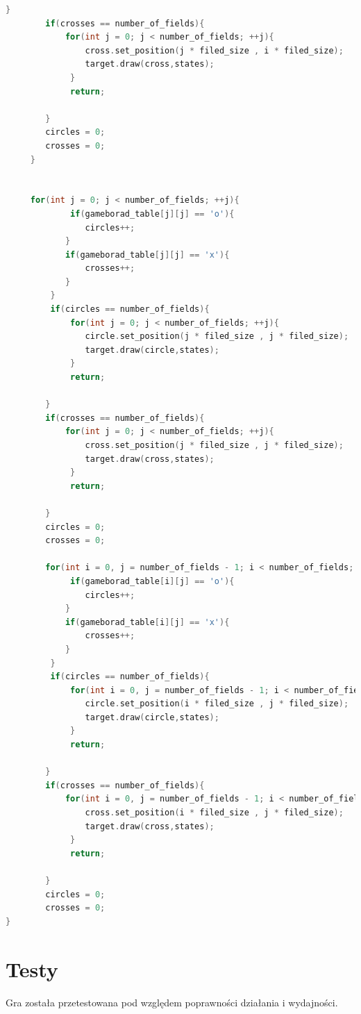 \documentclass[12pt]{article}
\begin{document}
\begin{lstlisting}[language=C++, caption=draw()]
        }
        if(crosses == number_of_fields){
            for(int j = 0; j < number_of_fields; ++j){
                cross.set_position(j * filed_size , i * filed_size);
                target.draw(cross,states);
             }
             return;

        }
        circles = 0;
        crosses = 0;
     }  


     for(int j = 0; j < number_of_fields; ++j){
             if(gameborad_table[j][j] == 'o'){
                circles++;
            }
            if(gameborad_table[j][j] == 'x'){
                crosses++;
            }
         }
         if(circles == number_of_fields){
             for(int j = 0; j < number_of_fields; ++j){
                circle.set_position(j * filed_size , j * filed_size);
                target.draw(circle,states);
             }
             return;

        }
        if(crosses == number_of_fields){
            for(int j = 0; j < number_of_fields; ++j){
                cross.set_position(j * filed_size , j * filed_size);
                target.draw(cross,states);
             }
             return;

        }
        circles = 0;
        crosses = 0;

        for(int i = 0, j = number_of_fields - 1; i < number_of_fields; ++i, --j){
             if(gameborad_table[i][j] == 'o'){
                circles++;
            }
            if(gameborad_table[i][j] == 'x'){
                crosses++;
            }
         }
         if(circles == number_of_fields){
             for(int i = 0, j = number_of_fields - 1; i < number_of_fields; ++i, --j){
                circle.set_position(i * filed_size , j * filed_size);
                target.draw(circle,states);
             }
             return;

        }
        if(crosses == number_of_fields){
            for(int i = 0, j = number_of_fields - 1; i < number_of_fields; ++i, --j){
                cross.set_position(i * filed_size , j * filed_size);
                target.draw(cross,states);
             }
             return;

        }
        circles = 0;
        crosses = 0;
}

    \end{lstlisting}
                

\section{Testy}
    Gra została przetestowana pod względem poprawności działania i wydajności. 
\end{document}
